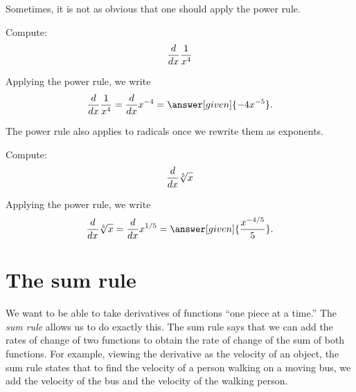 \documentclass{ximera}
\begin{document}
Sometimes, it is not as obvious that one should apply the power rule.

\begin{example}
	Compute:
	\[
	\frac{d}{\mathop{}\!d x} \frac{1}{x^4}
	\]
	\begin{explanation}
		Applying the power rule, we write
		\[
		\ddx \frac{1}{x^4} = \ddx x^{-4} = \answer[given]{-4x^{-5}}.
		\]
	\end{explanation}
\end{example}

The power rule also applies to radicals once we rewrite them as exponents.

\begin{example}
	Compute:
	\[
	\frac{d}{\mathop{}\!d x} \sqrt[5]{x}
	\]
	\begin{explanation}
		Applying the power rule, we write
		\[
		\ddx \sqrt[5]{x} = \ddx x^{1/5} = \answer[given]{\frac{x^{-4/5}}{5}}.
		\]
	\end{explanation}
\end{example}






\section{The sum rule}

We want to be able to take derivatives of functions ``one piece at a
time.'' The \textit{sum rule} allows us to do exactly this. The sum rule says
that we can add the rates of change of two functions to obtain the
rate of change of the sum of both functions. For example, viewing the
derivative as the velocity of an object, the sum rule states that to find the
velocity of a person walking on a moving bus, we add the
velocity of the bus and the velocity of the walking person.
\end{document}
